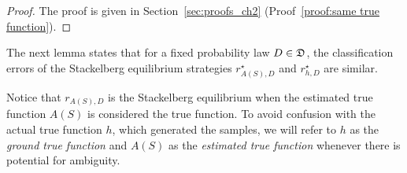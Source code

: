 \begin{proof} The proof is given in Section~\ref{sec:proofs_ch2} (Proof~\ref{proof:same true function}).
\end{proof}

The next lemma states that for a fixed probability law $D \in \mathfrak{D}$, the classification errors of the Stackelberg equilibrium strategies $r^\star_{A(S),D}$ and $r^\star_{h,D}$ are similar. 
\begin{rem}
Notice that $r_{A(S),D}$ is the Stackelberg equilibrium when the estimated true function $A(S)$ is considered the true function. To avoid confusion with the actual true function $h$, which generated the samples, we will refer to $h$ as the \textit{ground true function} and $A(S)$ as the \textit{estimated true function} whenever there is potential for ambiguity.
\end{rem}

